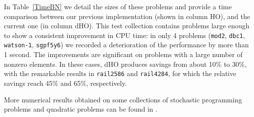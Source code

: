 In Table~\ref{TimeBN} we detail the sizes of these problems and provide 
a time comparison between our previous implementation (shown in column
HO), and the current one (in column dHO).
This test collection contains problems large enough 
to show a consistent improvement in CPU time: in only 4 problems 
({\tt mod2}, {\tt dbc1}, {\tt watson-1}, {\tt sgpf5y6}) 
we recorded a deterioration of the performance by more than 1 second.
The improvements are significant on problems with a large 
number of nonzero elements. In these cases, dHO
produces savings from about 10\% to 30\%, with the remarkable results
in {\tt rail2586} and {\tt rail4284}, for which the relative savings 
reach 45\% and 65\%, respectively.

More numerical results obtained on some collections of stochastic
programming problems and quadratic problems can be found in
\cite{ColomboGondzio05}.

